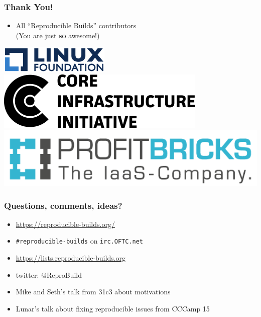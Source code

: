 \documentclass[14pt,aspectratio=169]{beamer}
\newif\ifplacelogo
\begin{document}
\begin{frame}
 \frametitle{Thank You!}

 \begin{itemize}
  \item
    {All “Reproducible Builds” contributors \\
        {\small (You are just \textbf{so} awesome!)}}

\end{itemize}

 \begin{center}
  \includegraphics[height=0.08\paperheight]{images/linux_foundation_logo.png}
  \hspace{0.05\paperwidth}
  \includegraphics[height=0.08\paperheight]{images/cii_logo.png}
  \hspace{0.05\paperwidth}
  \includegraphics[height=0.08\paperheight]{images/profitbricks_logo.png}
 \end{center}

 \vfill
 \begin{center}
 \end{center}
\end{frame}

\placelogofalse

\begin{frame}
 \frametitle{Questions, comments, ideas?}

 \begin{itemize}
  \item \url{https://reproducible-builds.org/}
  \item \texttt{\#reproducible-builds} on \texttt{irc.OFTC.net}
  \item \url{https://lists.reproducible-builds.org}
  \item twitter: @ReproBuild
  \item<2> Mike and Seth's talk from 31c3 about motivations
  \item<2> Lunar's talk about fixing reproducible issues from CCCamp 15
  \end{itemize}
\end{frame}
\end{document}
